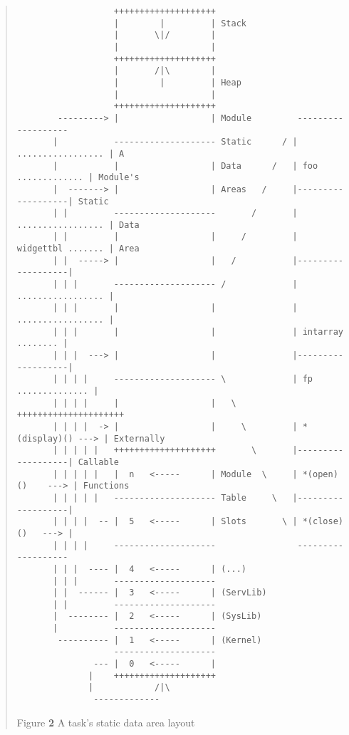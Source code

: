\begin {quote}
\scriptsize
\begin{verbatim}
                   ++++++++++++++++++++
                   |        |         | Stack
                   |       \|/        |
                   |                  |
                   ++++++++++++++++++++
                   |       /|\        |
                   |        |         | Heap
                   |                  |
                   ++++++++++++++++++++     
        ---------> |                  | Module         -------------------
       |           -------------------- Static      / | ................. | A
       |           |                  | Data      /   | foo ............. | Module's
       |  -------> |                  | Areas   /     |-------------------| Static
       | |         --------------------       /       | ................. | Data
       | |         |                  |     /         | widgettbl ....... | Area
       | |  -----> |                  |   /           |-------------------|
       | | |       -------------------- /             | ................. |
       | | |       |                  |               | ................. |
       | | |       |                  |               | intarray ........ |
       | | |  ---> |                  |               |-------------------|
       | | | |     -------------------- \             | fp .............. | 
       | | | |     |                  |   \           +++++++++++++++++++++
       | | | |  -> |                  |     \         | *(display)() ---> | Externally
       | | | | |   ++++++++++++++++++++       \       |-------------------| Callable
       | | | | |   |  n   <-----      | Module  \     | *(open)()    ---> | Functions
       | | | | |   -------------------- Table     \   |-------------------|
       | | | |  -- |  5   <-----      | Slots       \ | *(close)()   ---> |
       | | | |     --------------------                -------------------
       | | |  ---- |  4   <-----      | (...)
       | | |       --------------------
       | |  ------ |  3   <-----      | (ServLib)
       | |         -------------------- 
       |  -------- |  2   <-----      | (SysLib)
       |           --------------------
        ---------- |  1   <-----      | (Kernel)
                   --------------------
               --- |  0   <-----      |
              |    ++++++++++++++++++++ 
              |            /|\
               -------------
\end{verbatim}
\normalsize

\begin{center}
Figure {\bf 2} A task's static data area layout
\end{center}


\end{quote}
